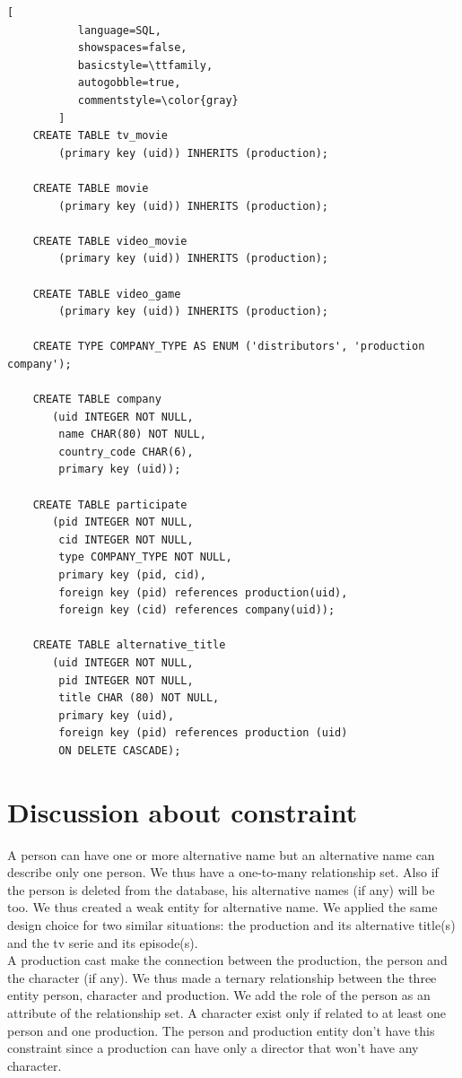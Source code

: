 \documentclass{article}
\begin{document}
\begin{lstlisting}[
           language=SQL,
           showspaces=false,
           basicstyle=\ttfamily,
           autogobble=true,
           commentstyle=\color{gray}
        ]
    CREATE TABLE tv_movie
        (primary key (uid)) INHERITS (production);
    
    CREATE TABLE movie
        (primary key (uid)) INHERITS (production);
    
    CREATE TABLE video_movie
        (primary key (uid)) INHERITS (production);
    
    CREATE TABLE video_game
        (primary key (uid)) INHERITS (production);
    
    CREATE TYPE COMPANY_TYPE AS ENUM ('distributors', 'production company');
    
    CREATE TABLE company
       (uid INTEGER NOT NULL,
        name CHAR(80) NOT NULL,
        country_code CHAR(6),
        primary key (uid));
    
    CREATE TABLE participate
       (pid INTEGER NOT NULL,
        cid INTEGER NOT NULL,
        type COMPANY_TYPE NOT NULL,
        primary key (pid, cid),
        foreign key (pid) references production(uid),
        foreign key (cid) references company(uid));
    
    CREATE TABLE alternative_title
       (uid INTEGER NOT NULL,
        pid INTEGER NOT NULL,
        title CHAR (80) NOT NULL,
        primary key (uid),
        foreign key (pid) references production (uid)
        ON DELETE CASCADE);
    \end{lstlisting}

\pagebreak
\section{Discussion about constraint}
    A person can have one or more alternative name but an alternative name can describe only one person. We thus have a one-to-many relationship set. Also if the person is deleted from the database, his alternative names (if any) will be too. We thus created a weak entity for alternative name.
    We applied the same design choice for two similar situations: the production and its alternative title(s) and the tv serie and its episode(s). \\
    
    A production cast make the connection between the production, the person and the character (if any). We thus made a ternary relationship between the three entity person, character and production. We add the role of the person as an attribute of the relationship set. A character exist only if related to at least one person and one production. The person and production entity don't have this constraint since a production can have only a director that won't have any character.  \\
    
\end{document}
